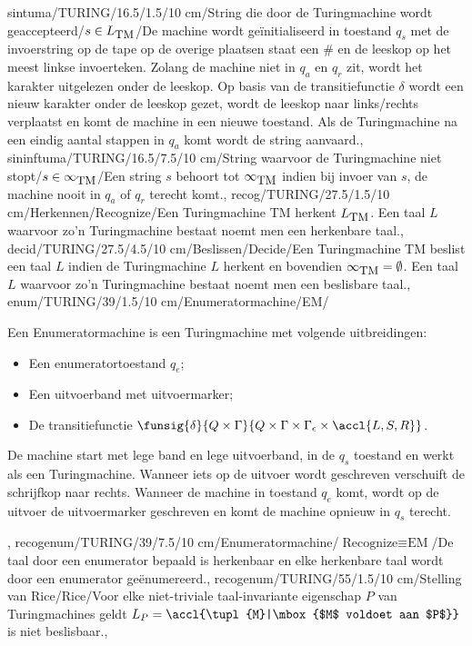 sintuma/TURING/16.5/1.5/10 cm/String die door de Turingmachine wordt geaccepteerd/$s\in L_{\mbox{\small TM}}$/{De machine wordt ge\"initialiseerd in toestand $q_s$ met de invoerstring op de tape op de overige plaatsen staat een $\#$ en de leeskop op het meest linkse invoerteken. Zolang de machine niet in $q_a$ en $q_r$ zit, wordt het karakter uitgelezen onder de leeskop. Op basis van de transitiefunctie $\delta$ wordt een nieuw karakter onder de leeskop gezet, wordt de leeskop naar links/rechts verplaatst en komt de machine in een nieuwe toestand. Als de Turingmachine na een eindig aantal stappen in $q_a$ komt wordt de string aanvaard.},
sininftuma/TURING/16.5/7.5/10 cm/String waarvoor de Turingmachine niet stopt/$s\in\infty_{\mbox{\small TM}}$/{Een string $s$ behoort tot $\infty_{\mbox{\small TM}}$ indien bij invoer van $s$, de machine nooit in $q_a$ of $q_r$ terecht komt.},
recog/TURING/27.5/1.5/10 cm/Herkennen/Recognize/{Een Turingmachine TM herkent $L_{\mbox{\small TM}}$. Een taal $L$ waarvoor zo'n Turingmachine bestaat noemt men een herkenbare taal.},
decid/TURING/27.5/4.5/10 cm/Beslissen/Decide/{Een Turingmachine TM beslist een taal $L$ indien de Turingmachine $L$ herkent en bovendien $\infty_{\mbox{\small TM}}=\emptyset$. Een taal $L$ waarvoor zo'n Turingmachine bestaat noemt men een beslisbare taal.},
enum/TURING/39/1.5/10 cm/Enumeratormachine/EM/{Een Enumeratormachine is een Turingmachine met volgende uitbreidingen:\begin{itemize}
 \item Een enumeratortoestand $q_e$;
 \item Een uitvoerband met uitvoermarker;
 \item De transitiefunctie $\funsig{\delta}{Q\times\Gamma}{Q\times\Gamma\times\Gamma_{\epsilon}\times\accl{L,S,R}}$.
\end{itemize}De machine start met lege band en lege uitvoerband, in de $q_s$ toestand en werkt als een Turingmachine. Wanneer iets op de uitvoer wordt geschreven verschuift de schrijfkop naar rechts. Wanneer de machine in toestand $q_e$ komt, wordt op de uitvoer de uitvoermarker geschreven en komt de machine opnieuw in $q_s$ terecht.},
recogenum/TURING/39/7.5/10 cm/Enumeratormachine/$\mbox{Recognize}\equiv\mbox{EM}$/{De taal door een enumerator bepaald is herkenbaar en elke herkenbare taal wordt door een enumerator ge\"enumereerd.},
recogenum/TURING/55/1.5/10 cm/Stelling van Rice/Rice/{Voor elke niet-triviale taal-invariante eigenschap $P$ van Turingmachines geldt $L_{P}=\accl{\tupl{M}|\mbox{$M$ voldoet aan $P$}}$ is niet beslisbaar.},
